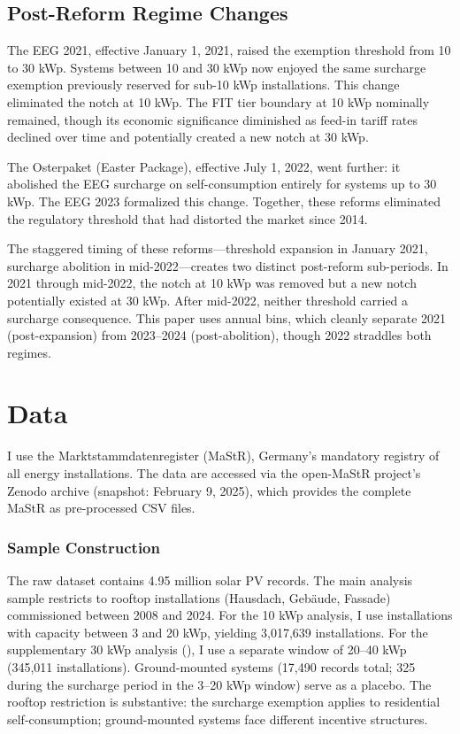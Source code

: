 \documentclass[12pt]{article}
\begin{document}
\subsection{Post-Reform Regime Changes}

The EEG 2021, effective January 1, 2021, raised the exemption threshold from 10 to 30 kWp. Systems between 10 and 30 kWp now enjoyed the same surcharge exemption previously reserved for sub-10 kWp installations. This change eliminated the notch at 10 kWp. The FIT tier boundary at 10 kWp nominally remained, though its economic significance diminished as feed-in tariff rates declined over time and potentially created a new notch at 30 kWp.

The Osterpaket (Easter Package), effective July 1, 2022, went further: it abolished the EEG surcharge on self-consumption entirely for systems up to 30 kWp. The EEG 2023 formalized this change. Together, these reforms eliminated the regulatory threshold that had distorted the market since 2014.

The staggered timing of these reforms---threshold expansion in January 2021, surcharge abolition in mid-2022---creates two distinct post-reform sub-periods. In 2021 through mid-2022, the notch at 10 kWp was removed but a new notch potentially existed at 30 kWp. After mid-2022, neither threshold carried a surcharge consequence. This paper uses annual bins, which cleanly separate 2021 (post-expansion) from 2023--2024 (post-abolition), though 2022 straddles both regimes.


\section{Data}
\label{sec:data}

I use the Marktstammdatenregister (MaStR), Germany's mandatory registry of all energy installations. The data are accessed via the open-MaStR project's Zenodo archive (snapshot: February 9, 2025), which provides the complete MaStR as pre-processed CSV files.

\subsubsection*{Sample Construction} The raw dataset contains 4.95 million solar PV records. The main analysis sample restricts to rooftop installations (Hausdach, Geb\"{a}ude, Fassade) commissioned between 2008 and 2024. For the 10 kWp analysis, I use installations with capacity between 3 and 20 kWp, yielding 3,017,639 installations. For the supplementary 30 kWp analysis (), I use a separate window of 20--40 kWp (345,011 installations). Ground-mounted systems (17,490 records total; 325 during the surcharge period in the 3--20 kWp window) serve as a placebo. The rooftop restriction is substantive: the surcharge exemption applies to residential self-consumption; ground-mounted systems face different incentive structures.
\end{document}
